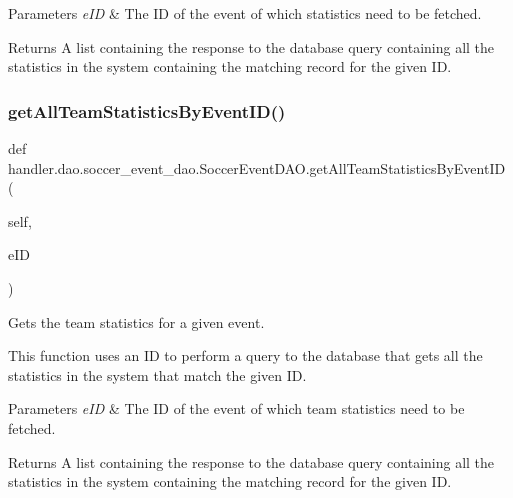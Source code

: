 \begin{DoxyParams}{Parameters}
{\em e\+ID} & The ID of the event of which statistics need to be fetched.\\
\hline
\end{DoxyParams}
\begin{DoxyReturn}{Returns}
A list containing the response to the database query containing all the statistics in the system containing the matching record for the given ID. 
\end{DoxyReturn}
\mbox{\label{classhandler_1_1dao_1_1soccer__event__dao_1_1_soccer_event_d_a_o_a2ec12ce0b813eb9cbfce32f4659e4498}} 
\subsubsection{\texorpdfstring{get\+All\+Team\+Statistics\+By\+Event\+I\+D()}{getAllTeamStatisticsByEventID()}}
{\footnotesize\ttfamily def handler.\+dao.\+soccer\+\_\+event\+\_\+dao.\+Soccer\+Event\+D\+A\+O.\+get\+All\+Team\+Statistics\+By\+Event\+ID (\begin{DoxyParamCaption}\item[{}]{self,  }\item[{}]{e\+ID }\end{DoxyParamCaption})}



Gets the team statistics for a given event. 

This function uses an ID to perform a query to the database that gets all the statistics in the system that match the given ID.


\begin{DoxyParams}{Parameters}
{\em e\+ID} & The ID of the event of which team statistics need to be fetched.\\
\hline
\end{DoxyParams}
\begin{DoxyReturn}{Returns}
A list containing the response to the database query containing all the statistics in the system containing the matching record for the given ID. 
\end{DoxyReturn}
\mbox{\label{classhandler_1_1dao_1_1soccer__event__dao_1_1_soccer_event_d_a_o_a44e0dd9fc8e37cb38269659cdb0dc147}} 
